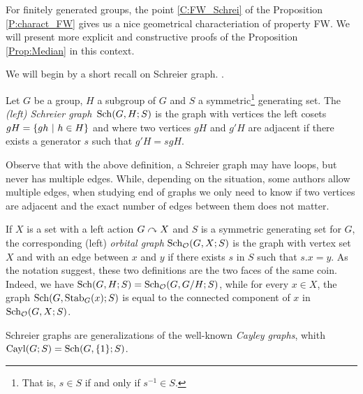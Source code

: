For finitely generated groups, the point \ref{C:FW_Schrei} of the Proposition \ref{P:charact_FW} gives us a nice geometrical characteriation of property FW. We will present more explicit and constructive proofs of the Proposition \ref{Prop:Median} in this context. 

We will begin by a short recall on Schreier graph. .
%
\begin{defn}
Let $G$ be a group, $H$ a subgroup of $G$ and $S$ a symmetric\footnote{That is, $s\in S$ if and only if $s^{-1}\in S$.} generating set. The \emph{(left) Schreier graph} $\operatorname{Sch}(G,H;S)$ is the graph with vertices the left cosets $gH=\{gh\ |\ h\in H\}$ and where two vertices $gH$ and $g'H$ are adjacent if there exists a generator $s$ such that $g'H = sgH$.
\end{defn}
%
Observe that with the above definition, a Schreier graph may have loops, but never has multiple edges. While, depending on the situation, some authors allow multiple edges, when studying end of graphs we only need to know if two vertices are adjacent and the exact number of edges between them does not matter.

If $X$ is a set with a left action $G\curvearrowright X$ and $S$ is a symmetric generating set for $G$, the corresponding (left) \emph{orbital graph} $\operatorname{Sch}_{\mathcal O}(G,X;S)$ is the graph with vertex set $X$ and with an edge between $x$ and $y$ if there exists $s$ in $S$ such that $s.x=y$.
As the notation suggest, these two definitions are the two faces of the same coin. Indeed, we have $\operatorname{Sch}(G,H;S)=\operatorname{Sch}_{\mathcal O}(G,G/H;S)$, while   for every $x\in X$, the graph $\operatorname{Sch}(G,\operatorname{Stab}_G(x);S)$ is equal to the connected component of $x$ in $\operatorname{Sch}_{\mathcal O}(G,X;S)$.

Schreier graphs are generalizations of the well-known \emph{Cayley graphs}, whith $\operatorname{Cayl}(G;S)=\operatorname{Sch}(G,\{1\};S)$.



